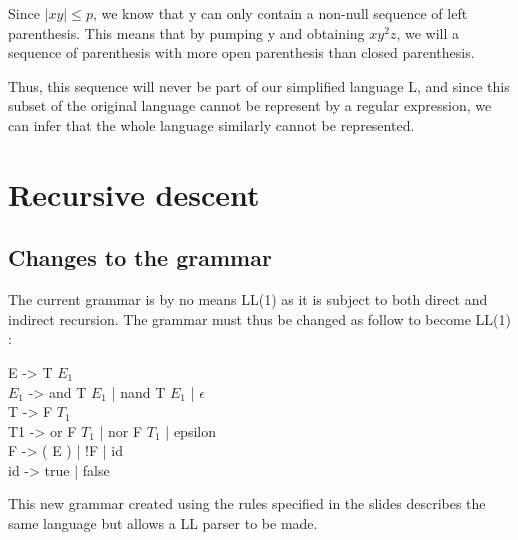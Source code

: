 \documentclass[a4paper, 11pt]{article}
\begin{document}
    	Since $|xy| \le p$, we know that y can only contain a non-null sequence of 
    	left parenthesis. This means that by pumping y and obtaining $xy^2 z$, we will
    	a sequence of parenthesis with more open parenthesis than closed parenthesis.
    	\newline
    	
    	Thus, this sequence will never be part of our simplified language L, and since
    	this subset of the original language cannot be represent by a regular expression,
    	we can infer that the whole language similarly cannot be represented.
    	
    \section{Recursive descent}
    \subsection{Changes to the grammar}
    
    	The current grammar is by no means LL(1) as it is subject to both direct and
    	indirect recursion. The grammar must thus be changed as follow to become LL(1) :
    	\newline
    	
    	\begin{flushleft}
    	E -> T $E_1$ \\
    	$E_1$ -> and T $E_1$ | nand T $E_1$ | $\epsilon$ \\
    	T -> F $T_1$ \\
		T1 -> or F $T_1$ | nor F $T_1$ | epsilon \\
		F -> ( E ) | !F | id \\
		id -> true | false \\
		\end{flushleft}

    	This new grammar created using the rules specified in the slides describes
    	the same language but allows a LL parser to be made.
\end{document}
